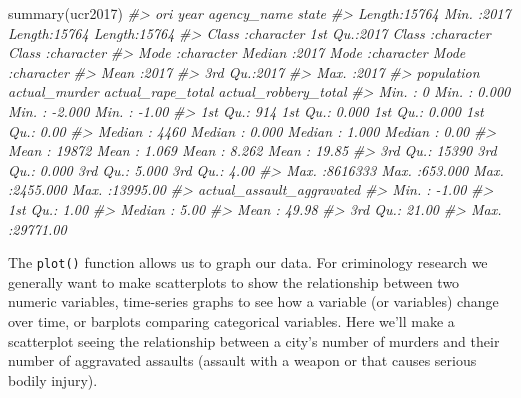 \documentclass[
]{krantz}
\makeatletter
\newenvironment{Shaded}{\begin{snugshade}}{\end{snugshade}}
\newcommand{\CommentTok}[1]{\textcolor[rgb]{0.37,0.37,0.37}{\textit{#1}}}
\newcommand{\FunctionTok}[1]{\textcolor[rgb]{0,0,0}{#1}}
\newcommand{\NormalTok}[1]{#1}
\newenvironment{kframe}{%
\medskip{}
\setlength{\fboxsep}{.8em}
 \def\at@end@of@kframe{}%
 \ifinner\ifhmode%
  \def\at@end@of@kframe{\end{minipage}}%
  \begin{minipage}{\columnwidth}%
 \fi\fi%
 \def\FrameCommand##1{\hskip\@totalleftmargin \hskip-\fboxsep
 \colorbox{shadecolor}{##1}\hskip-\fboxsep
     \hskip-\linewidth \hskip-\@totalleftmargin \hskip\columnwidth}%
 \MakeFramed {\advance\hsize-\width
   \@totalleftmargin\z@ \linewidth\hsize
   \@setminipage}}%
 {\par\unskip\endMakeFramed%
 \at@end@of@kframe}
\renewenvironment{Shaded}{\begin{kframe}}{\end{kframe}}
\makeatother
\begin{document}
\begin{Shaded}
\begin{Highlighting}[]
\FunctionTok{summary}\NormalTok{(ucr2017)}
\CommentTok{\#\textgreater{}      ori                 year      agency\_name           state          }
\CommentTok{\#\textgreater{}  Length:15764       Min.   :2017   Length:15764       Length:15764      }
\CommentTok{\#\textgreater{}  Class :character   1st Qu.:2017   Class :character   Class :character  }
\CommentTok{\#\textgreater{}  Mode  :character   Median :2017   Mode  :character   Mode  :character  }
\CommentTok{\#\textgreater{}                     Mean   :2017                                        }
\CommentTok{\#\textgreater{}                     3rd Qu.:2017                                        }
\CommentTok{\#\textgreater{}                     Max.   :2017                                        }
\CommentTok{\#\textgreater{}    population      actual\_murder     actual\_rape\_total  actual\_robbery\_total}
\CommentTok{\#\textgreater{}  Min.   :      0   Min.   :  0.000   Min.   :  {-}2.000   Min.   :   {-}1.00    }
\CommentTok{\#\textgreater{}  1st Qu.:    914   1st Qu.:  0.000   1st Qu.:   0.000   1st Qu.:    0.00    }
\CommentTok{\#\textgreater{}  Median :   4460   Median :  0.000   Median :   1.000   Median :    0.00    }
\CommentTok{\#\textgreater{}  Mean   :  19872   Mean   :  1.069   Mean   :   8.262   Mean   :   19.85    }
\CommentTok{\#\textgreater{}  3rd Qu.:  15390   3rd Qu.:  0.000   3rd Qu.:   5.000   3rd Qu.:    4.00    }
\CommentTok{\#\textgreater{}  Max.   :8616333   Max.   :653.000   Max.   :2455.000   Max.   :13995.00    }
\CommentTok{\#\textgreater{}  actual\_assault\_aggravated}
\CommentTok{\#\textgreater{}  Min.   :   {-}1.00         }
\CommentTok{\#\textgreater{}  1st Qu.:    1.00         }
\CommentTok{\#\textgreater{}  Median :    5.00         }
\CommentTok{\#\textgreater{}  Mean   :   49.98         }
\CommentTok{\#\textgreater{}  3rd Qu.:   21.00         }
\CommentTok{\#\textgreater{}  Max.   :29771.00}
\end{Highlighting}
\end{Shaded}

The \texttt{plot()} function allows us to graph our data. For criminology research we generally want to make scatterplots to show the relationship between two numeric variables, time-series graphs to see how a variable (or variables) change over time, or barplots comparing categorical variables. Here we'll make a scatterplot seeing the relationship between a city's number of murders and their number of aggravated assaults (assault with a weapon or that causes serious bodily injury).
\end{document}
